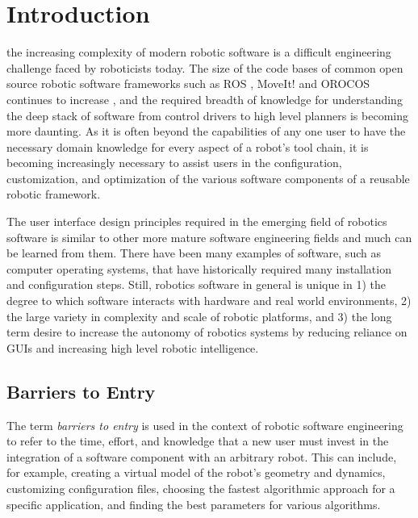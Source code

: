 \documentclass[10pt,journal,compsoc]{joser1}
\begin{document}
\section{Introduction}
 {the increasing complexity of modern robotic software is a difficult engineering challenge faced by roboticists today. The size of the code bases of common open source robotic software frameworks such as ROS \cite{quigley2009ros}, MoveIt! \cite{moveit} and OROCOS \cite{bruyninckx2001open} continues to increase \cite{makarenko2007benefits}, and the required breadth of knowledge for understanding the deep stack of software from control drivers to high level planners is becoming more daunting. As it is often beyond the capabilities of any one user to have the necessary domain knowledge for every aspect of a robot's tool chain, it is becoming increasingly necessary to assist users in the configuration, customization, and optimization of the various software components of a reusable robotic framework. 

The user interface design principles required in the emerging field of robotics software is similar to other more mature software engineering fields and much can be learned from them. There have been many examples of software, such as computer operating systems, that have historically required many installation and configuration steps. Still, robotics software in general is unique in 1) the degree to which software interacts with hardware and real world environments, 2) the large variety in complexity and scale of robotic platforms, and 3) the long term desire to increase the autonomy of robotics systems by reducing reliance on GUIs and increasing high level robotic intelligence. 

\subsection{Barriers to Entry}

The term \textit{barriers to entry} is used in the context of robotic software engineering to refer to the time, effort, and knowledge that a new user must invest in the integration of a software component with an arbitrary robot. This can include, for example, creating a virtual model of the robot's geometry and dynamics, customizing configuration files, choosing the fastest algorithmic approach for a specific application, and finding the best parameters for various algorithms.

}
\end{document}
